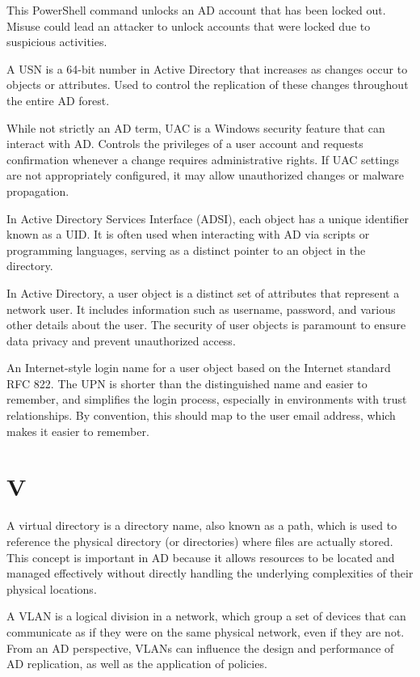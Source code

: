  This PowerShell command unlocks an AD account that has been locked out. Misuse could lead an attacker to unlock accounts that were locked due to suspicious activities.

 A USN is a 64-bit number in Active Directory that increases as changes occur to objects or attributes. Used to control the replication of these changes throughout the entire AD forest.

 While not strictly an AD term, UAC is a Windows security feature that can interact with AD. Controls the privileges of a user account and requests confirmation whenever a change requires administrative rights. If UAC settings are not appropriately configured, it may allow unauthorized changes or malware propagation.

 In Active Directory Services Interface (ADSI), each object has a unique identifier known as a UID. It is often used when interacting with AD via scripts or programming languages, serving as a distinct pointer to an object in the directory.

 In Active Directory, a user object is a distinct set of attributes that represent a network user. It includes information such as username, password, and various other details about the user. The security of user objects is paramount to ensure data privacy and prevent unauthorized access.

 An Internet-style login name for a user object based on the Internet standard RFC 822. The UPN is shorter than the distinguished name and easier to remember, and simplifies the login process, especially in environments with trust relationships. By convention, this should map to the user email address, which makes it easier to remember.

\section*{V}
 A virtual directory is a directory name, also known as a path, which is used to reference the physical directory (or directories) where files are actually stored. This concept is important in AD because it allows resources to be located and managed effectively without directly handling the underlying complexities of their physical locations.

 A VLAN is a logical division in a network, which group a set of devices that can communicate as if they were on the same physical network, even if they are not. From an AD perspective, VLANs can influence the design and performance of AD replication, as well as the application of policies.

